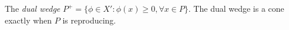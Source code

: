 The \emph{dual wedge} $P^+=\{\phi\in X':\phi(x)\geqslant0,\forall x\in P\}$. The dual wedge is a cone exactly when $P$ is reproducing.
